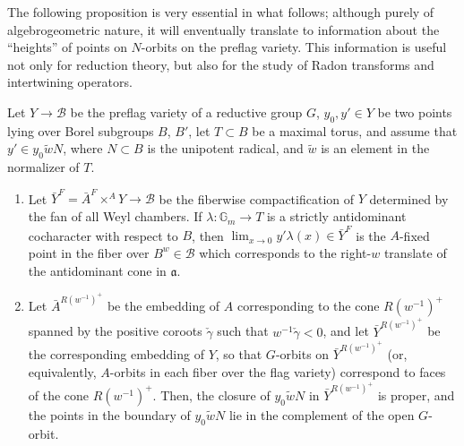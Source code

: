 The following proposition is very essential in what follows; although purely of algebrogeometric nature, it will enventually translate to information about the ``heights'' of points on $N$-orbits on the preflag variety. This information is useful not only for reduction theory, but also for the study of Radon transforms and intertwining operators.


\begin{proposition}
\label{proposition-horocycle-closures}
Let $Y\to \mathcal B$ be the preflag variety of a reductive group $G$, $y_0, y' \in Y$ be two points lying over Borel subgroups $B$, $B'$, let $T\subset B$ be a maximal torus, and assume that $y' \in  y_0 \tilde w N$, where $N\subset B$ is the unipotent radical, and $\tilde w$ is an element in the normalizer of $T$. 
\begin{enumerate}
 \item Let $\bar Y^F = \bar A^F\times^A Y \to \mathcal B$ be the fiberwise compactification of $Y$ determined by the fan of all Weyl chambers. If $\lambda:\mathbb G_m\to T$ is a strictly antidominant cocharacter with respect to $B$, then $\lim_{x\to 0} y' \lambda(x) \in \bar Y^F$ is the $A$-fixed point in the fiber over $B^w \in \mathcal B$ which corresponds to the right-$w$ translate of the antidominant cone in $\mathfrak a$. 

 \item Let $\bar A^{R(w^{-1})^+}$ be the embedding of $A$ corresponding to the cone $R(w^{-1})^+$ spanned by the positive coroots $\check\gamma$ such that $w^{-1}\check\gamma <0$, and let $\bar Y^{R(w^{-1})^+}$ be the corresponding embedding of $Y$, so that $G$-orbits on $\bar Y^{R(w^{-1})^+}$ (or, equivalently, $A$-orbits in each fiber over the flag variety) correspond to faces of the cone $R(w^{-1})^+$. 
 Then, the closure of $y_0 \tilde w N$ in $\bar Y^{R(w^{-1})^+}$ is proper, and the points in the boundary of $y_0 \tilde w N$ lie in the complement of the open $G$-orbit. 

\end{enumerate}
\end{proposition}

